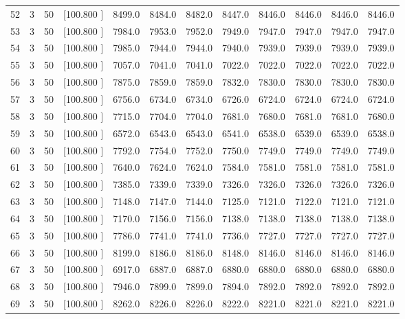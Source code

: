 \documentclass[12pt,a4paper]{article}
\begin{document}
\begin{center}
{\begin{tabular}{r r r r r r r r r r r r}
  52&  3& 50&[100.800   ]&  8499.0&  8484.0&  8482.0&  8447.0&  8446.0&  8446.0&  8446.0&  8446.0\\[-0.02in]
  53&  3& 50&[100.800   ]&  7984.0&  7953.0&  7952.0&  7949.0&  7947.0&  7947.0&  7947.0&  7947.0\\[-0.02in]
  54&  3& 50&[100.800   ]&  7985.0&  7944.0&  7944.0&  7940.0&  7939.0&  7939.0&  7939.0&  7939.0\\[-0.02in]
  55&  3& 50&[100.800   ]&  7057.0&  7041.0&  7041.0&  7022.0&  7022.0&  7022.0&  7022.0&  7022.0\\[-0.02in]
  56&  3& 50&[100.800   ]&  7875.0&  7859.0&  7859.0&  7832.0&  7830.0&  7830.0&  7830.0&  7830.0\\[-0.02in]
  57&  3& 50&[100.800   ]&  6756.0&  6734.0&  6734.0&  6726.0&  6724.0&  6724.0&  6724.0&  6724.0\\[-0.02in]
  58&  3& 50&[100.800   ]&  7715.0&  7704.0&  7704.0&  7681.0&  7680.0&  7681.0&  7681.0&  7680.0\\[-0.02in]
  59&  3& 50&[100.800   ]&  6572.0&  6543.0&  6543.0&  6541.0&  6538.0&  6539.0&  6539.0&  6538.0\\[-0.02in]
  60&  3& 50&[100.800   ]&  7792.0&  7754.0&  7752.0&  7750.0&  7749.0&  7749.0&  7749.0&  7749.0\\[-0.02in]
  61&  3& 50&[100.800   ]&  7640.0&  7624.0&  7624.0&  7584.0&  7581.0&  7581.0&  7581.0&  7581.0\\[-0.02in]
  62&  3& 50&[100.800   ]&  7385.0&  7339.0&  7339.0&  7326.0&  7326.0&  7326.0&  7326.0&  7326.0\\[-0.02in]
  63&  3& 50&[100.800   ]&  7148.0&  7147.0&  7144.0&  7125.0&  7121.0&  7122.0&  7121.0&  7121.0\\[-0.02in]
  64&  3& 50&[100.800   ]&  7170.0&  7156.0&  7156.0&  7138.0&  7138.0&  7138.0&  7138.0&  7138.0\\[-0.02in]
  65&  3& 50&[100.800   ]&  7786.0&  7741.0&  7741.0&  7736.0&  7727.0&  7727.0&  7727.0&  7727.0\\[-0.02in]
  66&  3& 50&[100.800   ]&  8199.0&  8186.0&  8186.0&  8148.0&  8146.0&  8146.0&  8146.0&  8146.0\\[-0.02in]
  67&  3& 50&[100.800   ]&  6917.0&  6887.0&  6887.0&  6880.0&  6880.0&  6880.0&  6880.0&  6880.0\\[-0.02in]
  68&  3& 50&[100.800   ]&  7946.0&  7899.0&  7899.0&  7894.0&  7892.0&  7892.0&  7892.0&  7892.0\\[-0.02in]
  69&  3& 50&[100.800   ]&  8262.0&  8226.0&  8226.0&  8222.0&  8221.0&  8221.0&  8221.0&  8221.0\\[-0.02in]

\end{tabular}}
\end{center}
\end{document}
